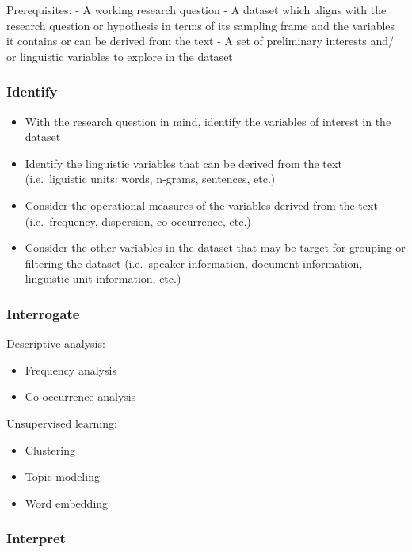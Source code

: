 \documentclass[
  letterpaper,
]{scrbook}
\providecommand{\tightlist}{%
  \setlength{\itemsep}{0pt}\setlength{\parskip}{0pt}}\usepackage{longtable,booktabs,array}
\begin{document}
Prerequisites: - A working research question - A dataset which aligns
with the research question or hypothesis in terms of its sampling frame
and the variables it contains or can be derived from the text - A set of
preliminary interests and/ or linguistic variables to explore in the
dataset

\hypertarget{eda-identify}{%
\subsubsection{Identify}\label{eda-identify}}

\begin{itemize}
\tightlist
\item
  With the research question in mind, identify the variables of interest
  in the dataset
\item
  Identify the linguistic variables that can be derived from the text
  (i.e.~liguistic units: words, n-grams, sentences, etc.)
\item
  Consider the operational measures of the variables derived from the
  text (i.e.~frequency, dispersion, co-occurrence, etc.)
\item
  Consider the other variables in the dataset that may be target for
  grouping or filtering the dataset (i.e.~speaker information, document
  information, linguistic unit information, etc.)
\end{itemize}

\hypertarget{eda-interrogate}{%
\subsubsection{Interrogate}\label{eda-interrogate}}

Descriptive analysis:

\begin{itemize}
\tightlist
\item
  Frequency analysis
\item
  Co-occurrence analysis
\end{itemize}

Unsupervised learning:

\begin{itemize}
\tightlist
\item
  Clustering
\item
  Topic modeling
\item
  Word embedding
\end{itemize}

\hypertarget{eda-interpret}{%
\subsubsection{Interpret}\label{eda-interpret}}
\end{document}
